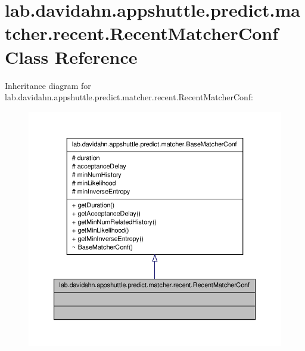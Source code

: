 \hypertarget{classlab_1_1davidahn_1_1appshuttle_1_1predict_1_1matcher_1_1recent_1_1_recent_matcher_conf}{\section{lab.\-davidahn.\-appshuttle.\-predict.\-matcher.\-recent.\-Recent\-Matcher\-Conf \-Class \-Reference}
\label{classlab_1_1davidahn_1_1appshuttle_1_1predict_1_1matcher_1_1recent_1_1_recent_matcher_conf}
}


\-Inheritance diagram for lab.\-davidahn.\-appshuttle.\-predict.\-matcher.\-recent.\-Recent\-Matcher\-Conf\-:
\nopagebreak
\begin{figure}[H]
\begin{center}
\leavevmode
\includegraphics[width=350pt]{classlab_1_1davidahn_1_1appshuttle_1_1predict_1_1matcher_1_1recent_1_1_recent_matcher_conf__inherit__graph}
\end{center}
\end{figure}



